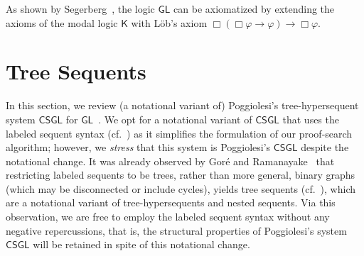 \documentclass[copyright,creativecommons]{eptcs}
\newcommand{\logicgl}{\mathsf{GL}}
\newcommand{\axi}{(\mathrm{A}1)}
\newcommand{\axii}{(\mathrm{A}2)}
\newcommand{\axiii}{(\mathrm{A}3)}
\newcommand{\axK}{(\mathrm{K})}
\newcommand{\axlob}{(\mathrm{L})}
\newcommand{\mpon}{(\mathrm{mp})}
\newcommand{\nec}{(\mathrm{n})}
\renewcommand{\phi}{\varphi}
\newcommand{\imp}{\rightarrow}
\newcommand{\calc}{\mathsf{CSGL}}
\begin{document}
As shown by Segerberg~\cite{Seg71}, the logic $\logicgl$ can be axiomatized by extending the axioms of the modal logic $\mathsf{K}$ with Löb's axiom $\Box(\Box \phi \imp \phi) \imp \Box \phi$.

\section{Tree Sequents}\label{sec:calculus}




In this section, we review (a notational variant of) Poggiolesi's tree-hypersequent system $\calc$ for $\logicgl$~\cite{Pog09b}. We opt for a notational variant of $\calc$ that uses the labeled sequent syntax (cf.~\cite{Sim94,Vig00}) as it simplifies the formulation of our proof-search algorithm; however, we \emph{stress} that this system is Poggiolesi's $\calc$ despite the notational change. %
It was already observed by Gor{\'e} and Ramanayake~\cite{GorRam12} that restricting labeled sequents to be trees, rather than more general, binary graphs (which may be disconnected or include cycles), yields tree sequents (cf.~\cite{IshKik07}), which are a notational variant of tree-hypersequents and nested sequents. Via this observation, we are free to employ the labeled sequent syntax without any negative repercussions, that is, the structural properties of Poggiolesi's system $\calc$ will be retained in spite of this notational change.
\end{document}
